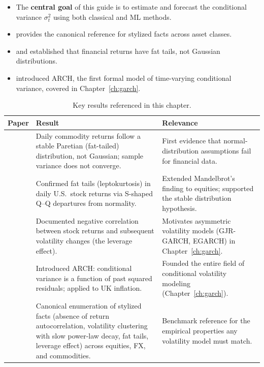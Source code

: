 \begin{itemize}[nosep]
  \item The \textbf{central goal} of this guide is to estimate and forecast the conditional variance $\sigma_t^2$ using both classical and ML methods.

  \item \citet{Cont2001} provides the canonical reference for stylized facts across asset classes.

  \item \citet{Mandelbrot1963} and \citet{Fama1965} established that financial returns have fat tails, not Gaussian distributions.

  \item \citet{Engle1982} introduced ARCH, the first formal model of time-varying conditional variance, covered in Chapter~\ref{ch:garch}.
\end{itemize}


\begin{table}[htbp]
\centering
\caption{Key results referenced in this chapter.}
\label{tab:ch01-key-results}
\begin{tabular}{@{} p{4.5cm} p{6cm} p{4cm} @{}}
\toprule
\textbf{Paper} & \textbf{Result} & \textbf{Relevance} \\
\midrule
\citet{Mandelbrot1963} &
Daily commodity returns follow a stable Paretian (fat-tailed) distribution, not Gaussian; sample variance does not converge. &
First evidence that normal-distribution assumptions fail for financial data. \\[6pt]

\citet{Fama1965} &
Confirmed fat tails (leptokurtosis) in daily U.S.\ stock returns via S-shaped Q--Q departures from normality. &
Extended Mandelbrot's finding to equities; supported the stable distribution hypothesis. \\[6pt]

\citet{Black1976} &
Documented negative correlation between stock returns and subsequent volatility changes (the leverage effect). &
Motivates asymmetric volatility models (GJR-GARCH, EGARCH) in Chapter~\ref{ch:garch}. \\[6pt]

\citet{Engle1982} &
Introduced ARCH: conditional variance is a function of past squared residuals; applied to UK inflation. &
Founded the entire field of conditional volatility modeling (Chapter~\ref{ch:garch}). \\[6pt]

\citet{Cont2001} &
Canonical enumeration of stylized facts (absence of return autocorrelation, volatility clustering with slow power-law decay, fat tails, leverage effect) across equities, FX, and commodities. &
Benchmark reference for the empirical properties any volatility model must match. \\
\bottomrule
\end{tabular}
\end{table}
